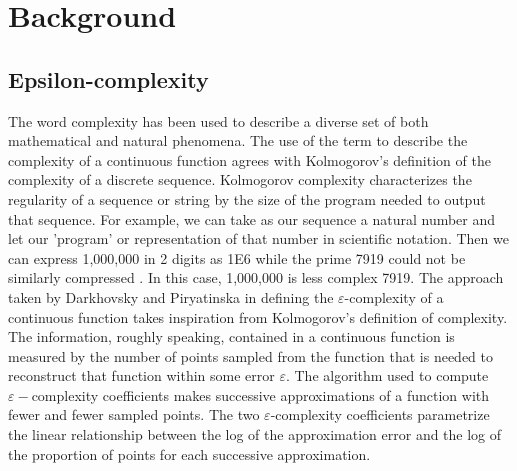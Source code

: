 

\chapter{Background}
  


  
\section{Epsilon-complexity} 
  

  The word complexity has been used to describe a diverse set of both mathematical and natural phenomena. The use of the term to describe the complexity of a continuous
  function agrees with Kolmogorov's definition of the complexity of a discrete sequence. Kolmogorov 
  complexity characterizes the regularity of a
   sequence or string by the size of the program needed to output that sequence. For example, we can take as our sequence a natural number and let our 'program' or representation of that number in scientific notation.
    Then we can express 1,000,000 in 2 digits as 1E6 while the prime 7919 could not be similarly compressed \cite{vitanyi1993}. In this case, 1,000,000 is less complex 7919. 
  The approach taken by Darkhovsky and Piryatinska in defining the $\varepsilon$-complexity of a continuous function takes inspiration from Kolmogorov's definition of complexity\cite{darkhovsky2013}. 
   The information, roughly speaking, contained in a continuous 
   function is measured by the number of points sampled from the function that is needed to reconstruct that function within some error $\varepsilon$. 
   The algorithm used to compute $\varepsilon-$complexity coefficients makes successive approximations of
   a function with fewer and fewer sampled points. The two $\varepsilon$-complexity coefficients parametrize the linear 
   relationship between 
   the log of the approximation error and the log of the proportion 
   of points for each successive approximation.

